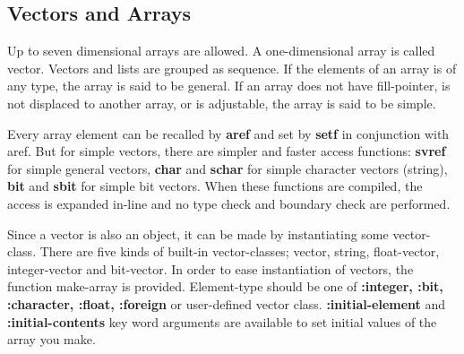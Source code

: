 \begin{refdesc}




\end{refdesc}
\newpage

\subsection{Vectors and Arrays}

Up to seven dimensional arrays are allowed.
A one-dimensional array is called vector.
Vectors and lists are grouped as sequence.
If the elements of an array is of any type, the array is said to be general.
If an array does not have fill-pointer, is not displaced to
another array, or is adjustable, the array is said to be simple.

Every array element can be recalled by {\bf aref} and set by {\bf setf} in
conjunction with aref.
But for simple vectors, there are simpler and faster access functions:
{\bf svref} for simple general vectors, {\bf char} and {\bf schar} for
simple character vectors (string), {\bf bit} and {\bf sbit} for
simple bit vectors.  When these functions are compiled,
the access is expanded in-line and no type check and boundary check are 
performed.

Since a vector is also an object,
it can be made by instantiating some vector-class.
There are five kinds of built-in vector-classes;
vector, string, float-vector, integer-vector and bit-vector.
In order to ease instantiation of vectors, the function make-array
is provided.
Element-type should be one of {\bf :integer, :bit, :character, :float, :foreign}
or user-defined vector class.
{\bf :initial-element} and {\bf :initial-contents} key word arguments are
available to set initial values of the array you make.

